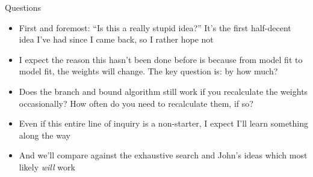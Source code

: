 \documentclass{beamer}
\begin{document}
\begin{frame}{Questions}
\begin{itemize}
\item First and foremost: ``Is this a really stupid idea?'' It's the first half-decent idea I've had since I
			came back, so I rather hope not
\item I expect the reason this hasn't been done before is because from model fit to model fit, the weights
			will change. The key question is: by how much?
\item Does the branch and bound algorithm still work if you recalculate the weights occasionally? How often
			do you need to recalculate them, if so?
\item Even if this entire line of inquiry is a non-starter, I expect I'll learn something along the way
\item And we'll compare against the exhaustive search and John's ideas which most likely \emph{will} work
\end{itemize}
\end{frame}
\end{document}
